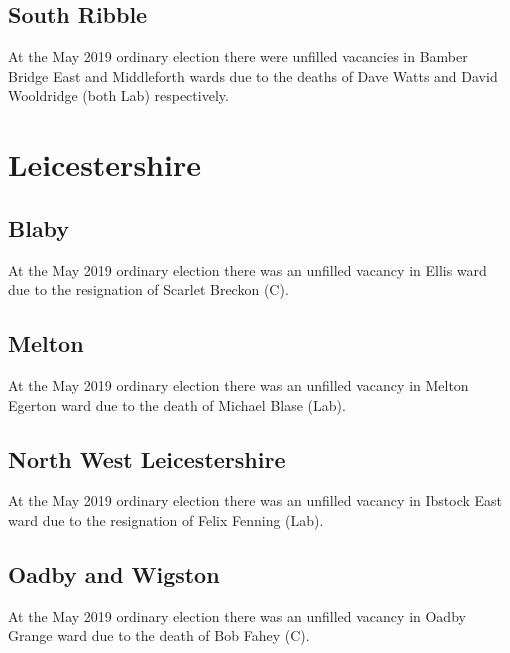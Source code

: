 \documentclass[a4paper,openany]{book}
\begin{document}
\begin{resultsiii}
\subsection*{South Ribble}

At the May 2019 ordinary election there were unfilled vacancies in Bamber Bridge East and Middleforth wards due to the deaths of Dave Watts and David Wooldridge (both Lab) respectively.

\section{Leicestershire}

\subsection*{Blaby}

At the May 2019 ordinary election there was an unfilled vacancy in Ellis ward due to the resignation of Scarlet Breckon (C).

\subsection*{Melton}

At the May 2019 ordinary election there was an unfilled vacancy in Melton Egerton ward due to the death of Michael Blase (Lab).

\subsection*{North West Leicestershire}

At the May 2019 ordinary election there was an unfilled vacancy in Ibstock East ward due to the resignation of Felix Fenning (Lab).

\subsection*{Oadby and Wigston}

At the May 2019 ordinary election there was an unfilled vacancy in Oadby Grange ward due to the death of Bob Fahey (C).


\end{resultsiii}
\end{document}
